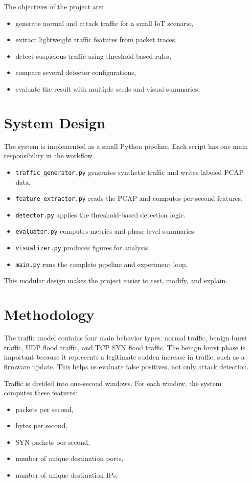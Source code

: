 \documentclass[11pt]{article}
\begin{document}
The objectives of the project are:
\begin{itemize}
  \item generate normal and attack traffic for a small IoT scenario,
  \item extract lightweight traffic features from packet traces,
  \item detect suspicious traffic using threshold-based rules,
  \item compare several detector configurations,
  \item evaluate the result with multiple seeds and visual summaries.
\end{itemize}

\section*{System Design}
The system is implemented as a small Python pipeline. Each script has one main responsibility in
the workflow.

\begin{itemize}
  \item \texttt{traffic\_generator.py} generates synthetic traffic and writes labeled PCAP data.
  \item \texttt{feature\_extractor.py} reads the PCAP and computes per-second features.
  \item \texttt{detector.py} applies the threshold-based detection logic.
  \item \texttt{evaluator.py} computes metrics and phase-level summaries.
  \item \texttt{visualizer.py} produces figures for analysis.
  \item \texttt{main.py} runs the complete pipeline and experiment loop.
\end{itemize}

This modular design makes the project easier to test, modify, and explain.

\section*{Methodology}
The traffic model contains four main behavior types: normal traffic, benign burst traffic, UDP
flood traffic, and TCP SYN flood traffic. The benign burst phase is important because it represents
a legitimate sudden increase in traffic, such as a firmware update. This helps us evaluate false
positives, not only attack detection.

Traffic is divided into one-second windows. For each window, the system computes these features:
\begin{itemize}
  \item packets per second,
  \item bytes per second,
  \item SYN packets per second,
  \item number of unique destination ports,
  \item number of unique destination IPs.
\end{itemize}
\end{document}
